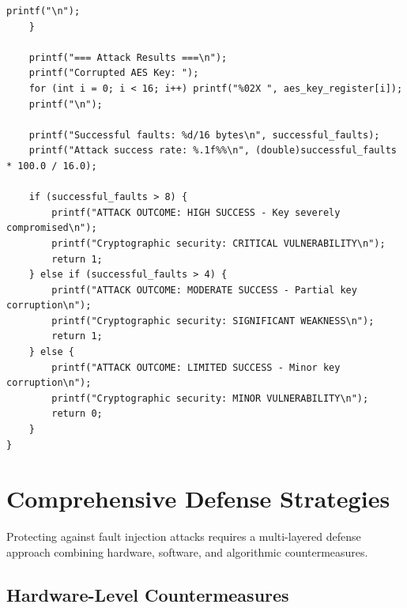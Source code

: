 \documentclass[12pt,a4paper]{article}
\begin{document}
\begin{lstlisting}[caption={Laser Fault Injection Control System}]
        printf("\n");
    }
    
    printf("=== Attack Results ===\n");
    printf("Corrupted AES Key: ");
    for (int i = 0; i < 16; i++) printf("%02X ", aes_key_register[i]);
    printf("\n");
    
    printf("Successful faults: %d/16 bytes\n", successful_faults);
    printf("Attack success rate: %.1f%%\n", (double)successful_faults * 100.0 / 16.0);
    
    if (successful_faults > 8) {
        printf("ATTACK OUTCOME: HIGH SUCCESS - Key severely compromised\n");
        printf("Cryptographic security: CRITICAL VULNERABILITY\n");
        return 1;
    } else if (successful_faults > 4) {
        printf("ATTACK OUTCOME: MODERATE SUCCESS - Partial key corruption\n");
        printf("Cryptographic security: SIGNIFICANT WEAKNESS\n");
        return 1;
    } else {
        printf("ATTACK OUTCOME: LIMITED SUCCESS - Minor key corruption\n");
        printf("Cryptographic security: MINOR VULNERABILITY\n");
        return 0;
    }
}
\end{lstlisting}

\section{Comprehensive Defense Strategies}

Protecting against fault injection attacks requires a multi-layered defense approach combining hardware, software, and algorithmic countermeasures.

\subsection{Hardware-Level Countermeasures}
\end{document}
